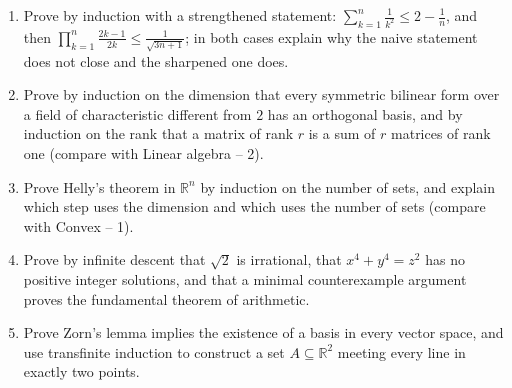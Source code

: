 \documentclass[11pt,a4paper]{article}
\renewcommand{\le}{\leqslant}
\begin{document}
\begin{enumerate}[itemsep=0.4em]
\item Prove by induction with a strengthened statement: $\sum_{k=1}^n\frac1{k^2}\le2-\frac1n$,
and then $\prod_{k=1}^n\frac{2k-1}{2k}\le\frac1{\sqrt{3n+1}}$; in both cases explain why the
naive statement does not close and the sharpened one does.

\item Prove by induction on the dimension that every symmetric bilinear form over a field of
characteristic different from $2$ has an orthogonal basis, and by induction on the rank that a
matrix of rank $r$ is a sum of $r$ matrices of rank one (compare with Linear algebra -- 2).

\item Prove Helly's theorem in $\mathbb R^n$ by induction on the number of sets, and explain which
step uses the dimension and which uses the number of sets (compare with Convex -- 1).

\item Prove by infinite descent that $\sqrt2$ is irrational, that $x^4+y^4=z^2$ has no positive
integer solutions, and that a minimal counterexample argument proves the fundamental theorem of
arithmetic.

\item Prove Zorn's lemma implies the existence of a basis in every vector space, and use
transfinite induction to construct a set $A\subseteq\mathbb R^2$ meeting every line in exactly
two points.
\end{enumerate}
\end{document}
